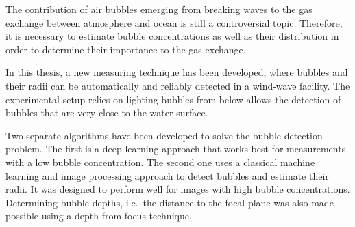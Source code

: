 The contribution of air bubbles emerging from breaking waves to the gas exchange between atmosphere and ocean is still a controversial topic. Therefore, it is necessary to estimate bubble concentrations as well as their distribution in order to determine their importance to the gas exchange. 

In this thesis, a new measuring technique has been developed, where bubbles and their radii can be automatically and reliably detected in a wind-wave facility. 
The experimental setup relies on lighting bubbles from below allows the detection of bubbles that are very close to the water surface. 

Two separate algorithms have been developed to solve the bubble detection problem. The first is a deep learning approach that works best for measurements with a low bubble concentration. The second one uses a classical machine learning and image processing approach to detect bubbles and estimate their radii. It was designed to perform well for images with high bubble concentrations. Determining bubble depths, i.e.\ the distance to the focal plane was also made possible using a depth from focus technique. 
